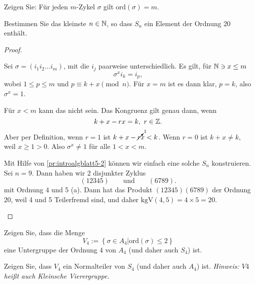 \begin{Problem}
	\begin{parts}
	\item Zeigen Sie: F\"{u}r jeden $m$-Zykel $\sigma$ gilt $\text{ord}(\sigma)=m$.
	\item Bestimmen Sie das kleinste $n\in \mathbb{N}$, so dass $S_n$ ein Element der Ordnung $20$ enthält.
	\end{parts}
\end{Problem}
\begin{proof}
	\begin{parts}
	\item Sei $\sigma=(i_1i_2\dots i_m)$, mit die $i_j$ paarweise unterschiedlich. Es gilt, f\"{u}r $\mathbb{N}\ni x\le m$
		\[
		\sigma^x i_k=i_p
		,\] 
		wobei $1\le p \le m$ und $p\equiv k+x\pmod{n}$. F\"{u}r $x=m$ ist es dann klar, $p=k$, also $\sigma^x=1$. 

		F\"{u}r $x < m$ kann das nicht sein. Das Kongruenz gilt genau dann, wenn
		\[
		k+x-rx=k,~r\in \mathbb{Z}
		.\] 
		Aber per Definition, wenn $r=1$ ist $k+x-\cancelto{1}{r}x<k$. Wenn $r=0$ ist $k+x\neq k$, weil $x\ge 1>0$. Also $\sigma^x\neq 1$ f\"{u}r alle $1 < x < m$.
	\item Mit Hilfe von \ref{pr:introalgblatt5-2} können wir einfach eine solche $S_n$ konstruieren. Sei $n=9$. Dann haben wir $2$ disjunkter Zyklus
		\[
			(12345)\qquad\text{und}\qquad(6789)
		.\] 
		mit Ordnung 4 und 5 (a). Dann hat das Produkt $(12345)(6789)$ der Ordnung $20$, weil 4 und 5 Teilerfremd sind, und daher $\text{kgV}(4,5)=4\times 5=20$.
	\end{parts}
\end{proof}

\begin{Problem}
	\begin{parts}
	\item Zeigen Sie, dass die Menge
		\[
			V_4:=\left\{ \sigma\in A_4|\text{ord}(\sigma)\le 2 \right\} 
		\]
		eine Untergruppe der Ordnung $4$ von $A_4$ (und daher auch $S_4$) ist.
	\item Zeigen Sie, dass $V_4$ ein Normalteiler von $S_4$ (und daher auch $A_4$) ist.
		{\footnotesize \emph{Hinweis: $V4$ heißt auch Kleinsche Vierergruppe.}}
	\end{parts}
\end{Problem}
